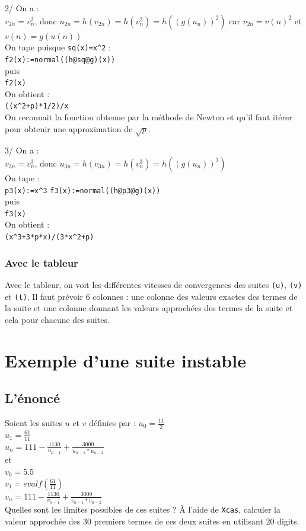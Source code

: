 \documentclass[a4paper,11pt]{book}
\begin{document}
2/ On a :\\
$v_{2n}=v_n^2$, donc 
$u_{2n}=h(v_{2n})=h(v_n^2)=h((g(u_n))^2)$ car $v_{2n}=v(n)^2$ et $v(n)=g(u(n))$\\
On tape puisque {\tt sq(x)=x\verb|^|2} :\\
{\tt f2(x):=normal((h@sq@g)(x))}\\
puis \\
{\tt f2(x)}\\
On obtient :\\
 {\tt ((x\verb|^|2+p)*1/2)/x}\\
On reconnait la fonction obtenue par la m\'ethode de Newton et
qu'il faut  it\'erer pour obtenir une approximation de $\sqrt p$.

3/ On a :\\
$v_{3n}=v_n^3$, donc 
$u_{3n}=h(v_{3n})=h(v_n^3)=h((g(u_n))^3)$ \\
On tape :\\
{\tt p3(x):=x\verb|^|3}
{\tt f3(x):=normal((h@p3@g)(x))}\\
puis \\
{\tt f3(x)}\\
On obtient :\\
 {\tt (x\verb|^|3+3*p*x)/(3*x\verb|^|2+p)}
\subsubsection{Avec le tableur}
Avec le tableur, on voit les diff\'erentes vitesses de convergences des suites
{\tt (u)}, {\tt (v)} et {\tt (t)}.
Il faut pr\'evoir 6 colonnes : une colonne des valeurs exactes des termes de 
la suite et une colonne donnant les valeurs approch\'ees des termes de 
la suite et cela pour chacune des suites.

\section{Exemple d'une suite instable}
\subsection{L'\'enonc\'e}
Soient les suites $u$ et $v$ d\'efinies par :
$u_0=\frac{11}{2}$\\
$u_1=\frac{61}{11}$\\
$u_n=111-\frac{1130}{u_{n-1}}+\frac{3000}{u_{n-1}*u_{n-2}}$\\
et \\
$v_0=5.5$\\
$v_1=evalf(\frac{61}{11})$\\
$v_n=111-\frac{1130}{v_{n-1}}+\frac{3000}{v_{n-1}*v_{n-2}}$\\
Quelles sont les limites possibles de ces suites ?
\`A l'aide de {\tt Xcas}, calculer la valeur approch\'ee des 30 premiers termes
de ces deux suites en utilisant 20 digits.
\end{document}
